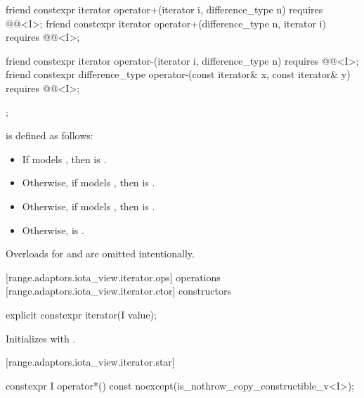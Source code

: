 \begin{addedblock}
\begin{codeblock}
{{    friend constexpr iterator operator+(iterator i, difference_type n)
      requires @@<I>;
    friend constexpr iterator operator+(difference_type n, iterator i)
      requires @@<I>;

    friend constexpr iterator operator-(iterator i, difference_type n)
      requires @@<I>;
    friend constexpr difference_type operator-(const iterator& x, const iterator& y)
      requires @@<I>;
  };
}
\end{codeblock}

\pnum
{} is defined as follows:
\begin{itemize}
\item If  models , then
 is .
\item Otherwise, if  models , then
 is .
\item Otherwise, if  models , then
 is .
\item Otherwise,  is .
\end{itemize}

\pnum
\begin{note}
Overloads for  and  are omitted intentionally.
\end{note}

[range.adaptors.iota_view.iterator.ops]{ operations}
[range.adaptors.iota_view.iterator.ctor]{ constructors}

\begin{itemdecl}
explicit constexpr iterator(I value);
\end{itemdecl}

\begin{itemdescr}
\pnum
\effects Initializes  with .
\end{itemdescr}

[range.adaptors.iota_view.iterator.star]{}

\begin{itemdecl}
constexpr I operator*() const noexcept(is_nothrow_copy_constructible_v<I>);
\end{itemdecl}


\end{addedblock}
